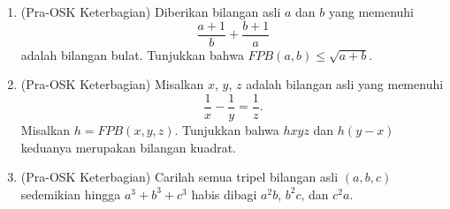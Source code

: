 \documentclass[12pt]{scrartcl}
\begin{document}
\begin{enumerate}[resume]
	\item (Pra-OSK Keterbagian)
	Diberikan bilangan asli $a$ dan $b$ yang memenuhi
	\[ \frac{a + 1}{b} + \frac{b + 1}{a} \]
	adalah bilangan bulat. Tunjukkan bahwa $FPB(a, b) \le \sqrt{a + b}$.

	\item (Pra-OSK Keterbagian)
	Misalkan $x$, $y$, $z$ adalah bilangan asli yang memenuhi
	\[ \frac{1}{x} - \frac{1}{y} = \frac{1}{z}. \]
	Misalkan $h = FPB(x, y, z)$.
	Tunjukkan bahwa $hxyz$ dan $h(y - x)$ keduanya merupakan bilangan kuadrat.

	\item (Pra-OSK Keterbagian)
	Carilah semua tripel bilangan asli $(a, b, c)$ sedemikian hingga
	$a^3 + b^3 + c^3$ habis dibagi $a^2b$, $b^2c$, dan $c^2a$.

\end{enumerate}
\end{document}
